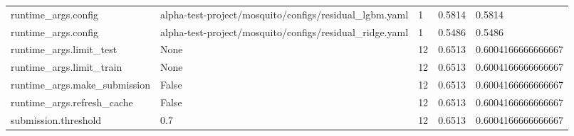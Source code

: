 \begin{tabular}{lllll}
runtime\_args.config & alpha-test-project/mosquito/configs/residual\_lgbm.yaml & 1 & 0.5814 & 0.5814 \\
runtime\_args.config & alpha-test-project/mosquito/configs/residual\_ridge.yaml & 1 & 0.5486 & 0.5486 \\
runtime\_args.limit\_test & None & 12 & 0.6513 & 0.6004166666666667 \\
runtime\_args.limit\_train & None & 12 & 0.6513 & 0.6004166666666667 \\
runtime\_args.make\_submission & False & 12 & 0.6513 & 0.6004166666666667 \\
runtime\_args.refresh\_cache & False & 12 & 0.6513 & 0.6004166666666667 \\
submission.threshold & 0.7 & 12 & 0.6513 & 0.6004166666666667 \\
\end{tabular}
